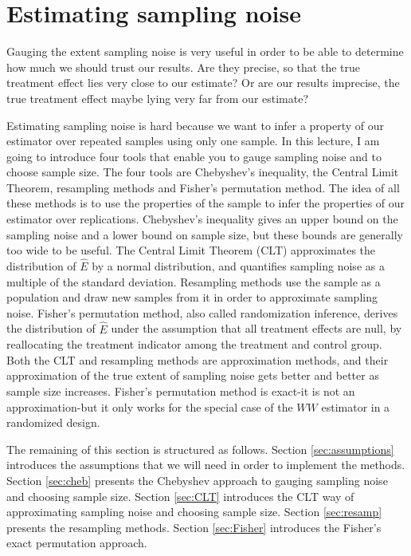 \documentclass[]{book}
\theoremstyle{definition}
\theoremstyle{definition}
\theoremstyle{definition}
\theoremstyle{remark}
\begin{document}
\section{Estimating sampling noise}\label{sec:estimsampnoise}

Gauging the extent sampling noise is very useful in order to be able to
determine how much we should trust our results. Are they precise, so
that the true treatment effect lies very close to our estimate? Or are
our results imprecise, the true treatment effect maybe lying very far
from our estimate?

Estimating sampling noise is hard because we want to infer a property of
our estimator over repeated samples using only one sample. In this
lecture, I am going to introduce four tools that enable you to gauge
sampling noise and to choose sample size. The four tools are Chebyshev's
inequality, the Central Limit Theorem, resampling methods and Fisher's
permutation method. The idea of all these methods is to use the
properties of the sample to infer the properties of our estimator over
replications. Chebyshev's inequality gives an upper bound on the
sampling noise and a lower bound on sample size, but these bounds are
generally too wide to be useful. The Central Limit Theorem (CLT)
approximates the distribution of \(\hat{E}\) by a normal distribution,
and quantifies sampling noise as a multiple of the standard deviation.
Resampling methods use the sample as a population and draw new samples
from it in order to approximate sampling noise. Fisher's permutation
method, also called randomization inference, derives the distribution of
\(\hat{E}\) under the assumption that all treatment effects are null, by
reallocating the treatment indicator among the treatment and control
group. Both the CLT and resampling methods are approximation methods,
and their approximation of the true extent of sampling noise gets better
and better as sample size increases. Fisher's permutation method is
exact-it is not an approximation-but it only works for the special case
of the \(WW\) estimator in a randomized design.

The remaining of this section is structured as follows. Section
\ref{sec:assumptions} introduces the assumptions that we will need in
order to implement the methods. Section \ref{sec:cheb} presents the
Chebyshev approach to gauging sampling noise and choosing sample size.
Section \ref{sec:CLT} introduces the CLT way of approximating sampling
noise and choosing sample size. Section \ref{sec:resamp} presents the
resampling methods. Section \ref{sec:Fisher} introduces the Fisher's
exact permutation approach.
\end{document}
